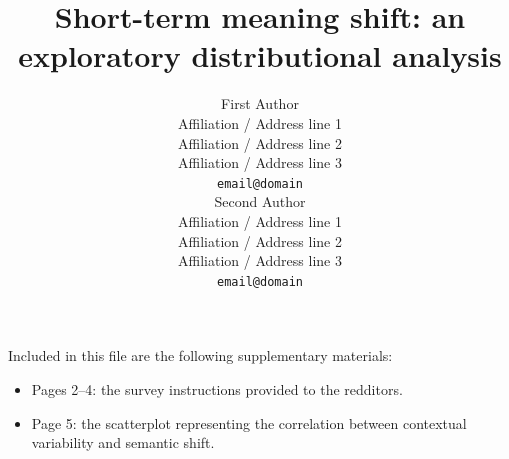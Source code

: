 \documentclass[11pt,a4paper]{article}
\title{Short-term meaning shift: an exploratory distributional analysis}
\author{First Author \\
  Affiliation / Address line 1 \\
  Affiliation / Address line 2 \\
  Affiliation / Address line 3 \\
  {\tt email@domain} \\\And
  Second Author \\
  Affiliation / Address line 1 \\
  Affiliation / Address line 2 \\
  Affiliation / Address line 3 \\
  {\tt email@domain} \\}
\date{}
\begin{document}
\maketitle


\begin{minipage}{15cm}
Included in this file are the following supplementary materials:
\begin{itemize}
\item Pages 2--4: the survey instructions provided to the redditors.
\item Page 5: the scatterplot representing the correlation between contextual variability and semantic shift.

\end{itemize}

\end{minipage}

\pagebreak
\clearpage

\end{document}
